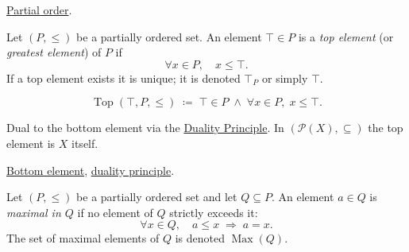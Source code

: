 \begin{remark*}[Dependencies]
\hyperref[def:lattice-order-partial-order]{Partial order}.
\end{remark*}


\begin{tcolorbox}[colback=defbox, colframe=defborder, arc=2pt,
  left=6pt, right=6pt, top=4pt, bottom=4pt,
  title={\small\textbf{Definition (Top Element)}},
  fonttitle=\small\bfseries]
\begin{definition}
\label{def:top-element}
Let $(P, \leq)$ be a partially ordered set.  An element $\top \in P$ is
a \emph{top element} (or \emph{greatest element}) of $P$ if
\[
\forall x \in P, \quad x \leq \top.
\]
If a top element exists it is unique; it is denoted $\top_P$ or simply
$\top$.
\end{definition}
\end{tcolorbox}

\begin{remark*}
\[
\operatorname{Top}(\top, P, \leq)
\;\coloneqq\;
\top \in P \;\land\; \forall x \in P,\; x \leq \top.
\]
\end{remark*}

\begin{remark*}[Interpretation]
Dual to the bottom element via the
\hyperref[prop:duality-principle]{Duality Principle}.
In $(\mathcal{P}(X), \subseteq)$ the top element is $X$ itself.
\end{remark*}

\begin{remark*}[Dependencies]
\hyperref[def:bottom-element]{Bottom element},
\hyperref[prop:duality-principle]{duality principle}.
\end{remark*}


\begin{definition}
\label{def:maximal-element}
Let $(P, \leq)$ be a partially ordered set and let $Q \subseteq P$.  An
element $a \in Q$ is \emph{maximal in $Q$} if no element of $Q$ strictly
exceeds it:
\[
\forall x \in Q, \quad a \leq x \;\Longrightarrow\; a = x.
\]
The set of maximal elements of $Q$ is denoted $\operatorname{Max}(Q)$.
\end{definition}

